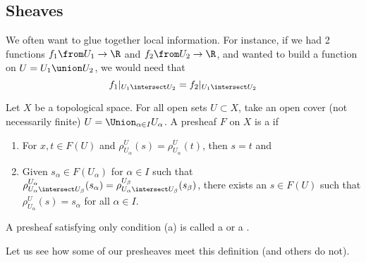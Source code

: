 \documentclass[11pt,leqno,oneside]{amsbook}
\renewcommand{\F}{F} %
\numberwithin{thm}{section}
\begin{document}
\subsection{Sheaves}
We often want to glue together local information. For instance, if we
had 2 functions \(f_1 \from U_1 \to \R\) and \(f_2 \from U_2 \to \R\),
and wanted to build a function on \(U = U_1 \union U_2\), we would
need that \[
  f_1|_{U_1 \intersect U_2} = f_2|_{U_1 \intersect U_2}
\]
\begin{defn}
  Let \(X\) be a topological space. For all open sets \(U \subset X\),
  take an open cover (not necessarily finite)  \(U = \Union_{\alpha
    \in I} U_\alpha\). A presheaf \(\F\) on \(X\) is a  if
  \begin{enumerate}[label=(S\arabic*)]
  \item\label{sheaf-1} For \(x,t \in \F(U)\) and \(\rho^U_{U_\alpha}(s) =
    \rho^U_{U_\alpha}(t)\), then \(s=t\) and
  \item\label{sheaf-2} Given \(s_\alpha \in \F(U_\alpha)\) for \(\alpha \in I\) such that
    \(\rho^{U_\alpha}_{U_\alpha \intersect U_\beta}(s_\alpha) =
    \rho^{U_\beta}_{U_\alpha \intersect U_\beta}(s_\beta) \), there
    exists an \(s \in \F(U)\) such that \(\rho^U_{U_\alpha}(s) =
    s_\alpha \) for all \(\alpha \in I\).
  \end{enumerate}
\end{defn}
\begin{rmk}
  A presheaf satisfying only condition (a) is called a  or a .
\end{rmk}
Let us see how some of our presheaves meet this definition (and others
do not).
\end{document}
